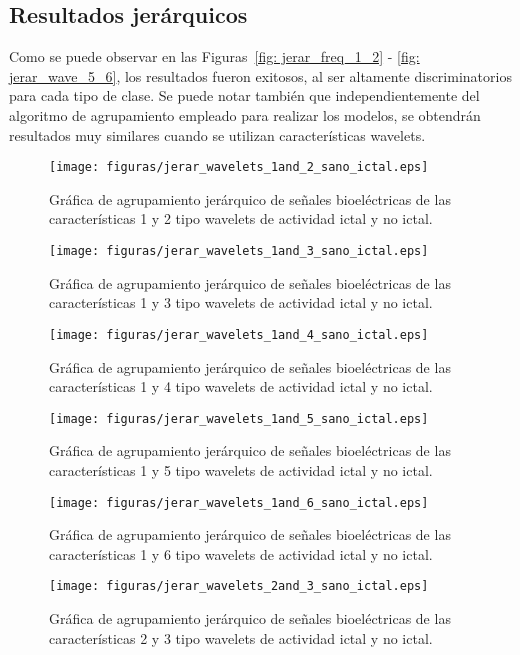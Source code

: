 \subsection{Resultados jerárquicos}
Como se puede observar en las Figuras~\ref{fig: jerar_freq_1_2} - \ref{fig: jerar_wave_5_6}, los resultados fueron exitosos, al ser altamente discriminatorios para cada tipo de clase. Se puede notar también que independientemente del algoritmo de agrupamiento empleado para realizar los modelos, se obtendrán resultados muy similares cuando se utilizan características wavelets. 

\begin{figure}[H]
    \centering
    \texttt{[image: figuras/jerar\_wavelets\_1and\_2\_sano\_ictal.eps]}
    \caption{Gráfica de agrupamiento jerárquico de señales bioeléctricas de las características 1 y 2 tipo wavelets de actividad ictal y no ictal.}
    \label{fig: jerar_wave_1_2}
\end{figure}
\begin{figure}[H]
    \centering
    \texttt{[image: figuras/jerar\_wavelets\_1and\_3\_sano\_ictal.eps]}
    \caption{Gráfica de agrupamiento jerárquico de señales bioeléctricas de las características 1 y 3 tipo wavelets de actividad ictal y no ictal.}
    \label{fig: jerar_wave_1_3}
\end{figure}
\begin{figure}[H]
    \centering
    \texttt{[image: figuras/jerar\_wavelets\_1and\_4\_sano\_ictal.eps]}
    \caption{Gráfica de agrupamiento jerárquico de señales bioeléctricas de las características 1 y 4 tipo wavelets de actividad ictal y no ictal.}
    \label{fig: jerar_wave_1_4}
\end{figure}
\begin{figure}[H]
    \centering
    \texttt{[image: figuras/jerar\_wavelets\_1and\_5\_sano\_ictal.eps]}
    \caption{Gráfica de agrupamiento jerárquico de señales bioeléctricas de las características 1 y 5 tipo wavelets de actividad ictal y no ictal.}
    \label{fig: jerar_wave_1_5}
\end{figure}
\begin{figure}[H]
    \centering
    \texttt{[image: figuras/jerar\_wavelets\_1and\_6\_sano\_ictal.eps]}
    \caption{Gráfica de agrupamiento jerárquico de señales bioeléctricas de las características 1 y 6 tipo wavelets de actividad ictal y no ictal.}
    \label{fig: jerar_wave_1_6}
\end{figure}
\begin{figure}[H]
    \centering
    \texttt{[image: figuras/jerar\_wavelets\_2and\_3\_sano\_ictal.eps]}
    \caption{Gráfica de agrupamiento jerárquico de señales bioeléctricas de las características 2 y 3 tipo wavelets de actividad ictal y no ictal.}
    \label{fig: jerar_wave_2_3}
\end{figure}
